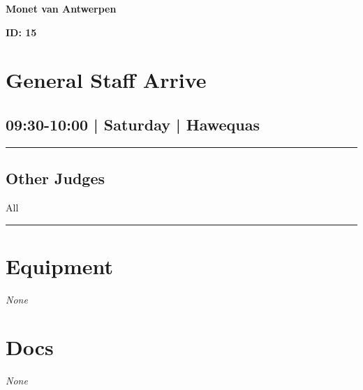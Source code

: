 \documentclass[10pt, A5]{article}
\newcommand{\newtitle}[1]{\begin{center}{\Huge\bfseries #1 }\\ \vspace{5mm}\end{center}}
\newcommand{\newsubtitle}[1]{\begin{center}{\color{grey}\Large\bfseries #1 }\\ \vspace{5mm}\end{center}}
\begin{document}
		\newtitle{Monet van Antwerpen}
	\newsubtitle{ID: 15}


        \begin{framed}
        \begin{minipage}{\textwidth}

        \setcounter{section}{2}
        \section{General Staff Arrive}
        \subsection*{09:30-10:00 | Saturday | Hawequas}

        \vspace{0.25cm}
        \hrule
        \vspace{0.25cm}


        \subsection*{Other Judges}
                    All

            \vspace{0.25cm}
        \hrule
        \vspace{0.25cm}

        \begin{multicols}{2}

		\section*{\faWrench \: Equipment}

				\textit{None}
		
		\vfill\null
		\columnbreak

			\section*{\faFile \: Docs}
		 	\textit{None}
	

		\vfill\null

		\end{multicols}
\end{minipage}
\end{framed}
\end{document}
